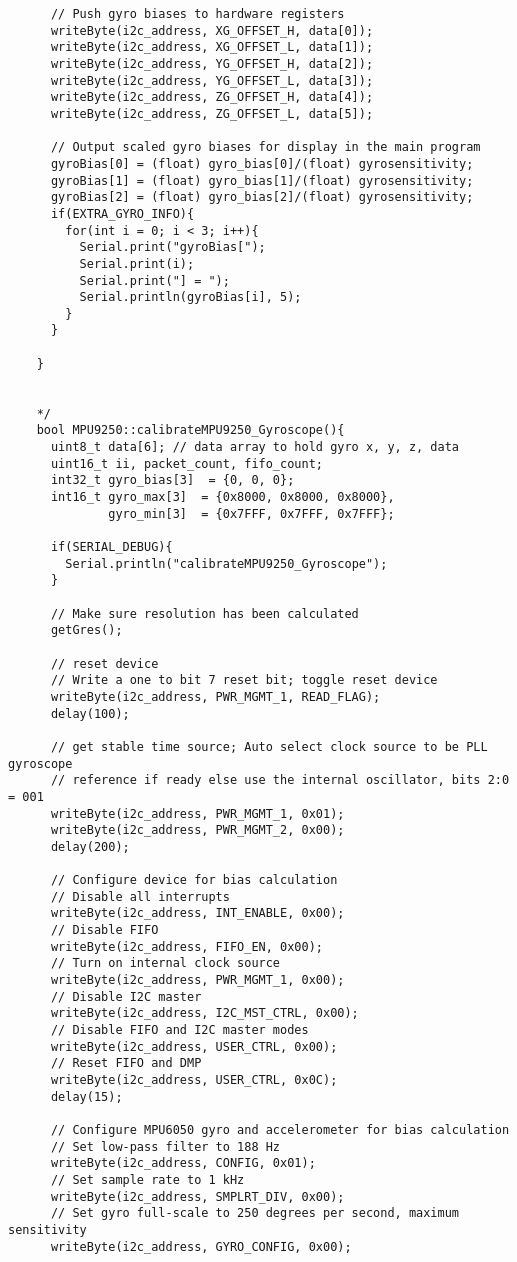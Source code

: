 \begin{lstlisting}
	  // Push gyro biases to hardware registers
	  writeByte(i2c_address, XG_OFFSET_H, data[0]);
	  writeByte(i2c_address, XG_OFFSET_L, data[1]);
	  writeByte(i2c_address, YG_OFFSET_H, data[2]);
	  writeByte(i2c_address, YG_OFFSET_L, data[3]);
	  writeByte(i2c_address, ZG_OFFSET_H, data[4]);
	  writeByte(i2c_address, ZG_OFFSET_L, data[5]);

	  // Output scaled gyro biases for display in the main program
	  gyroBias[0] = (float) gyro_bias[0]/(float) gyrosensitivity;
	  gyroBias[1] = (float) gyro_bias[1]/(float) gyrosensitivity;
	  gyroBias[2] = (float) gyro_bias[2]/(float) gyrosensitivity;
	  if(EXTRA_GYRO_INFO){
	    for(int i = 0; i < 3; i++){
	      Serial.print("gyroBias[");
	      Serial.print(i);
	      Serial.print("] = ");
	      Serial.println(gyroBias[i], 5);
	    }
	  }

	}


	*/
	bool MPU9250::calibrateMPU9250_Gyroscope(){
	  uint8_t data[6]; // data array to hold gyro x, y, z, data
	  uint16_t ii, packet_count, fifo_count;
	  int32_t gyro_bias[3]  = {0, 0, 0};
	  int16_t gyro_max[3]  = {0x8000, 0x8000, 0x8000},
	          gyro_min[3]  = {0x7FFF, 0x7FFF, 0x7FFF};

	  if(SERIAL_DEBUG){
	    Serial.println("calibrateMPU9250_Gyroscope");
	  }

	  // Make sure resolution has been calculated
	  getGres();

	  // reset device
	  // Write a one to bit 7 reset bit; toggle reset device
	  writeByte(i2c_address, PWR_MGMT_1, READ_FLAG);
	  delay(100);

	  // get stable time source; Auto select clock source to be PLL gyroscope
	  // reference if ready else use the internal oscillator, bits 2:0 = 001
	  writeByte(i2c_address, PWR_MGMT_1, 0x01);
	  writeByte(i2c_address, PWR_MGMT_2, 0x00);
	  delay(200);

	  // Configure device for bias calculation
	  // Disable all interrupts
	  writeByte(i2c_address, INT_ENABLE, 0x00);
	  // Disable FIFO
	  writeByte(i2c_address, FIFO_EN, 0x00);
	  // Turn on internal clock source
	  writeByte(i2c_address, PWR_MGMT_1, 0x00);
	  // Disable I2C master
	  writeByte(i2c_address, I2C_MST_CTRL, 0x00);
	  // Disable FIFO and I2C master modes
	  writeByte(i2c_address, USER_CTRL, 0x00);
	  // Reset FIFO and DMP
	  writeByte(i2c_address, USER_CTRL, 0x0C);
	  delay(15);

	  // Configure MPU6050 gyro and accelerometer for bias calculation
	  // Set low-pass filter to 188 Hz
	  writeByte(i2c_address, CONFIG, 0x01);
	  // Set sample rate to 1 kHz
	  writeByte(i2c_address, SMPLRT_DIV, 0x00);
	  // Set gyro full-scale to 250 degrees per second, maximum sensitivity
	  writeByte(i2c_address, GYRO_CONFIG, 0x00);


\end{lstlisting}
